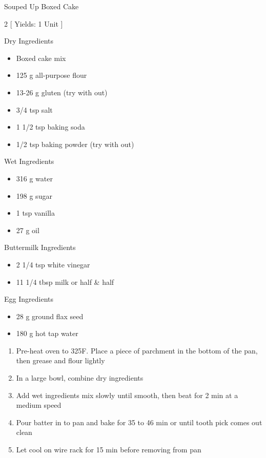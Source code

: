 \begin{Large}
    Souped Up Boxed Cake
\end{Large}

\begin{scriptsize}
\begin{multicols}{2}
[
\vspace{1em}
Yields: 1 Unit
\vspace{-1.5em}
]

Dry Ingredients
\begin{itemize}
    \item Boxed cake mix
    \item 125 g all-purpose flour
    \item 13-26 g gluten (try with out)
    \item 3/4 tsp salt
    \item 1 1/2 tsp baking soda
    \item 1/2 tsp baking powder (try with out)
\end{itemize}

Wet Ingredients
\begin{itemize}
    \item 316 g water
    \item 198 g sugar
    \item 1 tsp vanilla
    \item 27 g oil
\end{itemize}

Buttermilk Ingredients
\begin{itemize}
    \item 2 1/4 tsp white vinegar
    \item 11 1/4 tbsp milk or half \& half
\end{itemize}

Egg Ingredients
\begin{itemize}
    \item 28 g ground flax seed
    \item 180 g hot tap water
\end{itemize}
\end{multicols}
\end{scriptsize}

\begin{footnotesize}
\begin{enumerate}
    \item Pre-heat oven to 325\degree F. Place a piece of parchment in the bottom of the pan, then grease and flour lightly
    \item In a large bowl, combine dry ingredients
    \item Add wet ingredients mix slowly until smooth, then beat for 2 min at a medium speed
    \item Pour batter in to pan and bake for 35 to 46 min or until tooth pick comes out clean
    \item Let cool on wire rack for 15 min before removing from pan

\end{enumerate}
\end{footnotesize}

\vspace{2em}
